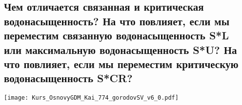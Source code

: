 

\subsection{Чем отличается связанная и критическая водонасыщенность? На что повлияет, если мы переместим связанную водонасыщенность S*L или максимальную водонасыщенность S*U? На что повлияет, если мы переместим критическую водонасыщенность S*CR?}

\texttt{[image: Kurs\_OsnovyGDM\_Kai\_774\_gorodovSV\_v6\_0.pdf]}

